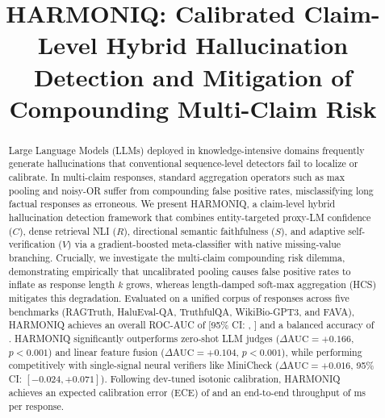 \documentclass[conference]{IEEEtran}
\begin{document}
\title{HARMONIQ: Calibrated Claim-Level Hybrid Hallucination Detection and Mitigation of Compounding Multi-Claim Risk}

\author{
}

\maketitle

\begin{abstract}
Large Language Models (LLMs) deployed in knowledge-intensive domains frequently generate hallucinations that conventional sequence-level detectors fail to localize or calibrate. 
In multi-claim responses, standard aggregation operators such as max pooling and noisy-OR suffer from compounding false positive rates, misclassifying long factual responses as erroneous.
We present HARMONIQ, a claim-level hybrid hallucination detection framework that combines entity-targeted proxy-LM confidence ($C$), dense retrieval NLI ($R$), directional semantic faithfulness ($S$), and adaptive self-verification ($V$) via a gradient-boosted meta-classifier with native missing-value branching.
Crucially, we investigate the multi-claim compounding risk dilemma, demonstrating empirically that uncalibrated pooling causes false positive rates to inflate as response length $k$ grows, whereas length-damped soft-max aggregation (HCS) mitigates this degradation.
Evaluated on a unified corpus of \Datasettotalresponses{} responses across five benchmarks (RAGTruth, HaluEval-QA, TruthfulQA, WikiBio-GPT3, and FAVA), HARMONIQ achieves an overall ROC-AUC of \Aucharmoniq{} [95\% CI: \Auclowharmoniq{}, \Auchighharmoniq{}] and a balanced accuracy of \Balaccharmoniq{}.
HARMONIQ significantly outperforms zero-shot LLM judges ($\Delta \text{AUC} = +0.166$, $p < 0.001$) and linear feature fusion ($\Delta \text{AUC} = +0.104$, $p < 0.001$), while performing competitively with single-signal neural verifiers like MiniCheck ($\Delta \text{AUC} = +0.016$, 95\% CI: $[-0.024, +0.071]$).
Following dev-tuned isotonic calibration, HARMONIQ achieves an expected calibration error (ECE) of \Eceharmoniq{} and an end-to-end throughput of \LatencymeanendToEndpipeline{} ms per response.
\end{abstract}
\end{document}
